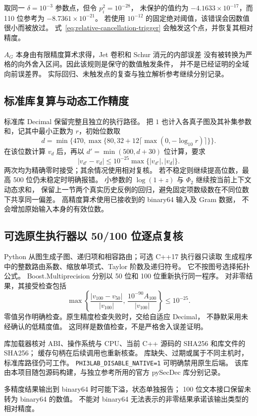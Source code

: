 取同一 $\delta=10^{-3}$ 参数点，但令 $p_i^2=10^{-28}$，
未保护的值约为 $-4.1633\times10^{-17}$，而 110 位参考为
$-8.7361\times10^{-21}$。
若使用 $10^{-12}$ 的固定绝对阈值，该错误会因数值很小而被放过。
式~\eqref{eq:relative-cancellation-trigger} 会触发这个点，并恢复其相对精度。

$A_G$ 本身由有限精度算术求得，Jet 卷积和 Schur 消元的内部误差
没有被转换为严格的向外舍入区间。因此该规则是保守的数值触发条件，
并不是已经证明的全域向前误差界。
实际回归、未触发点的复查与独立解析参考继续分别记录。

\subsection{标准库复算与动态工作精度}

标准库 Decimal 保留完整且独立的执行路径。
把 $1$ 也计入各真子图及其补集参数和，记其中最小正数为 $r$，初始位数取
\[
 d=\min\{470,\max\{80,
           32+12\lceil\max(0,-\log_{10}r)\rceil\}\}.
\]
在该位数计算 $v_d$ 后，再以 $d'=\min(500,d+30)$ 位计算，要求
\[
 |v_{d'}-v_d|
 \le10^{-25}\max\{|v_{d'}|,|v_d|\}.
\]
两次均为精确零时接受；其余情况使用相对复核。
若不稳定则继续提高位数，最高 500 位仍未稳定时明确报错。
小参数的 $\log(1+z)$ 与 $\Phi_2$ 继续按当前上下文动态求和，
保留上一节两个真实历史反例的回归，避免固定项数级数在不同位数下共享同一偏差。
高精度算术使用已接收到的 binary64 输入及 Gram 数据，
不会增加原始输入本身的有效位数。

\subsection{可选原生执行器以 50/100 位逐点复核}

Python 从图生成子图、递归项和相容路由；可选 C++17 执行器只读取
生成程序中的整数路由系数、缩放单项式、Taylor 阶数及递归符号。
它不按图号选择拓扑公式。
Boost.Multiprecision 分别以 50 位和 100 位重新执行同一程序。
对非零结果，其接受检查包括
\[
 \max\left\{
  \frac{|v_{100}-v_{50}|}{|v_{100}|},\,
  \frac{10^{-90}A_{100}}{|v_{100}|}
 \right\}\le10^{-25}.
\]
零值另作明确检查。原生精度检查失败时，交给自适应 Decimal，
不静默采用未经确认的低精度值。
这同样是数值检查，不是严格舍入误差证明。

库加载器核对 ABI、操作系统与 CPU、当前 C++ 源码的 SHA256 和库文件的 SHA256；
缓存句柄在后续调用也重新核查。
库缺失、过期或属于不同主机时，标准库路径仍可工作。
\texttt{PHI3LAB\_DISABLE\_NATIVE=1} 可明确禁用原生后端。
该库由本项目随包源码构建，与独立参考所用的官方 pySecDec 库分别记录。

多精度结果输出到 binary64 时可能下溢，状态单独报告；
100 位文本接口保留未转为 binary64 的数值。
不能对 binary64 无法表示的非零结果承诺该输出类型的相对精度。

